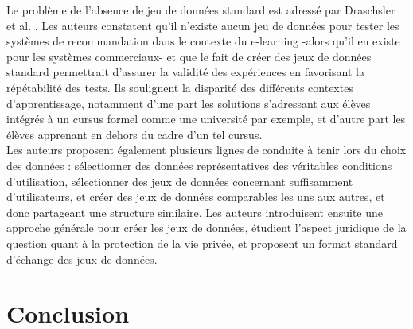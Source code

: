 \documentclass[conference]{./sty/IEEEtran}
\begin{document}
Le problème de l'absence de jeu de données standard est adressé par Draschsler et al. \cite{DBLP:journals/procedia/DrachslerBVVDMBLSFW10}. Les auteurs constatent qu'il n'existe aucun jeu de données pour tester les systèmes de recommandation dans le contexte du e-learning -alors qu'il en existe pour les systèmes commerciaux- et que le fait de créer des jeux de données standard permettrait d'assurer la validité des expériences en favorisant la répétabilité des tests. Ils soulignent la disparité des différents contextes d'apprentissage, notamment d'une part les solutions s'adressant aux élèves intégrés à un cursus formel comme une université par exemple, et d'autre part les élèves apprenant en dehors du cadre d'un tel cursus.\\
Les auteurs proposent également plusieurs lignes de conduite à tenir lors du choix des données : sélectionner des données représentatives des véritables conditions d'utilisation, sélectionner des jeux de données concernant suffisamment d'utilisateurs, et créer des jeux de données comparables les uns aux autres, et donc partageant une structure similaire. Les auteurs introduisent ensuite une approche générale pour créer les jeux de données, étudient l'aspect juridique de la question quant à la protection de la vie privée, et proposent un format standard d'échange des jeux de données.\\



\section{Conclusion}




\end{document}
